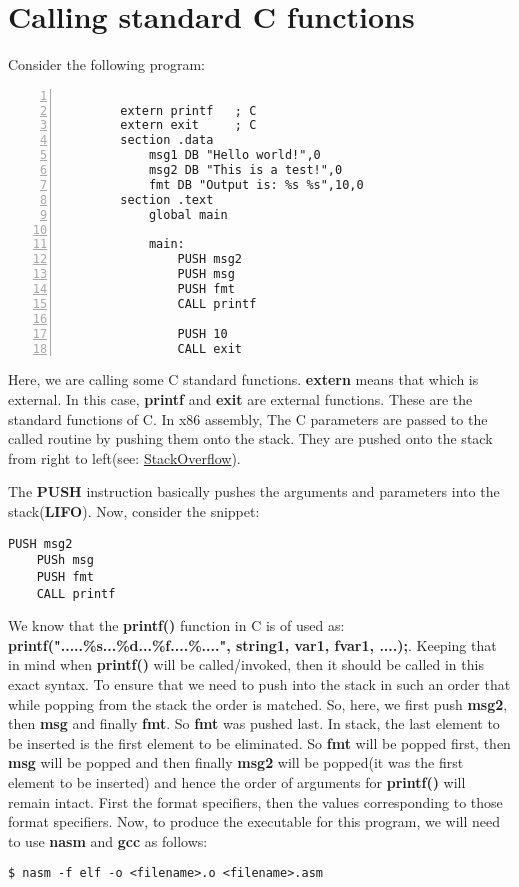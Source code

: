 \documentclass{article}
\makeatletter
\renewcommand\paragraph{\@startsection{paragraph}{4}{\z@}{-3.25ex \@plus -1ex \@minus -.2ex}{1.5ex \@plus .2ex}{\normalfont\normalsize\bfseries}}
\makeatother
\begin{document}
	\section{Calling standard C functions}\label{sec:sec1}
	\paragraph{}
	Consider the following program:
	\begin{Verbatim}[numbers=left, frame=single]
		
		extern printf   ; C
		extern exit     ; C
		section .data
			msg1 DB "Hello world!",0
			msg2 DB "This is a test!",0
			fmt DB "Output is: %s %s",10,0
		section .text
			global main
			
			main:
				PUSH msg2
				PUSH msg
				PUSH fmt
				CALL printf
				
				PUSH 10
				CALL exit
	\end{Verbatim}
Here, we are calling some C standard functions. \textbf{extern} means that which is external. In this case, \textbf{printf} and \textbf{exit} are external functions. These are the standard functions of C. In x86 assembly, The C parameters are passed to the called routine by pushing them onto the stack. They are pushed onto the stack from right to left(see: \href{https://stackoverflow.com/questions/16255608/calling-c-functions-from-x86-assembly-language}{StackOverflow}).

The \textbf{PUSH} instruction basically pushes the arguments and parameters into the stack(\textbf{LIFO}).
Now, consider the snippet:
\begin{lstlisting}[frame=single, breaklines=true]
	PUSH msg2
	PUSh msg
	PUSH fmt
	CALL printf
\end{lstlisting}
We know that the \textbf{printf()} function in C is of used as: \textbf{printf(".....\%s...\%d...\%f....\%....", string1, var1, fvar1, ....);}. Keeping that in mind when \textbf{printf()} will be called/invoked, then it should be called in this exact syntax. To ensure that we need to push into the stack in such an order that while popping from the stack the order is matched. So, here, we first push \textbf{msg2}, then \textbf{msg} and finally \textbf{fmt}. So \textbf{fmt} was pushed last. In stack, the last element to be inserted is the first element to be eliminated. So \textbf{fmt} will be popped first, then \textbf{msg} will be popped and then finally \textbf{msg2} will be popped(it was the first element to be inserted) and hence the order of arguments for \textbf{printf()} will remain intact. First the format specifiers, then the values corresponding to those format specifiers.
\newpage
Now, to produce the executable for this program, we will need to use \textbf{nasm} and \textbf{gcc} as follows:
\begin{Verbatim}[frame=single]
	$ nasm -f elf -o <filename>.o <filename>.asm
\end{Verbatim}
\end{document}
